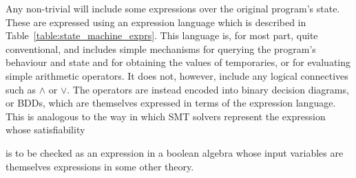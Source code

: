 Any non-trivial {\StateMachine} will include some expressions over the
original program's state.  These are expressed using an expression
language which is described in Table~\ref{table:state_machine_exprs}.
This language is, for most part, quite conventional, and includes
simple mechanisms for querying the program's behaviour and state and
for obtaining the values of {\StateMachine} temporaries, or for
evaluating simple arithmetic operators.  It does not, however, include
any logical connectives such as $\wedge$ or $\vee$.  The operators are
instead encoded into binary decision diagrams, or
BDDs\cite{Brace1990}, which are themselves expressed in terms of the
expression language.  This is analogous to the way in which SMT
solvers represent the expression whose satisfiability
is to be checked
as an expression in a boolean algebra whose input variables are
themselves expressions in some other theory.

